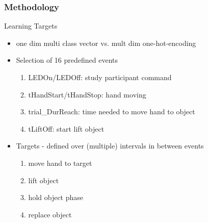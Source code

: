 \documentclass{beamer}
\begin{document}
\begin{frame}
\frametitle{Methodology}
Learning Targets
\begin{itemize}
  	\item one dim multi class vector vs. mult dim one-hot-encoding

    \item Selection of 16 predefined events
    \begin{enumerate}
        \item LEDOn/LEDOff: study participant command
        \item tHandStart/tHandStop: hand moving
        \item trial\_DurReach: time needed to move hand to object
        \item tLiftOff: start lift object
    \end{enumerate}
 
    \item Targets - defined over (multiple) intervals in between events
    \begin{enumerate}
    \item move hand to target
        \item lift object
        \item hold object phase
        \item replace object
    \end{enumerate}

\end{itemize}


\end{frame}
\end{document}
